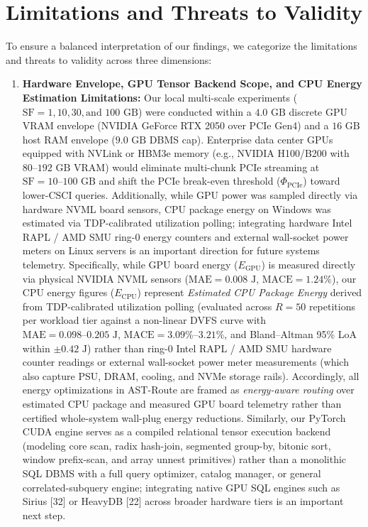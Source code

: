 \documentclass[10pt,a4paper]{article}
\begin{document}
\section{Limitations and Threats to Validity}
To ensure a balanced interpretation of our findings, we categorize the limitations and threats to validity across three dimensions:
\begin{enumerate}[leftmargin=1.5em,itemsep=2pt]
    \item \textbf{Hardware Envelope, GPU Tensor Backend Scope, and CPU Energy Estimation Limitations:} Our local multi-scale experiments ($\text{SF}=1, 10, 30, \text{and } 100\text{ GB}$) were conducted within a $4.0\text{ GB}$ discrete GPU VRAM envelope (NVIDIA GeForce RTX 2050 over PCIe Gen4) and a $16\text{ GB}$ host RAM envelope ($9.0\text{ GB}$ DBMS cap). Enterprise data center GPUs equipped with NVLink or HBM3e memory (e.g., NVIDIA H100/B200 with $80\text{--}192\text{ GB}$ VRAM) would eliminate multi-chunk PCIe streaming at $\text{SF}=10\text{--}100\text{ GB}$ and shift the PCIe break-even threshold ($\Phi_{\text{PCIe}}$) toward lower-CSCI queries. Additionally, while GPU power was sampled directly via hardware NVML board sensors, CPU package energy on Windows was estimated via TDP-calibrated utilization polling; integrating hardware Intel RAPL / AMD SMU ring-0 energy counters and external wall-socket power meters on Linux servers is an important direction for future systems telemetry. Specifically, while GPU board energy ($E_{\text{GPU}}$) is measured directly via physical NVIDIA NVML sensors ($\text{MAE}=0.008\text{ J}$, $\text{MACE}=1.24\%$), our CPU energy figures ($E_{\text{CPU}}$) represent \emph{Estimated CPU Package Energy} derived from TDP-calibrated utilization polling (evaluated across $R=50$ repetitions per workload tier against a non-linear DVFS curve with $\text{MAE}=0.098\text{--}0.205\text{ J}$, $\text{MACE}=3.09\%\text{--}3.21\%$, and Bland--Altman 95\% LoA within $\pm 0.42\text{ J}$) rather than ring-0 Intel RAPL / AMD SMU hardware counter readings or external wall-socket power meter measurements (which also capture PSU, DRAM, cooling, and NVMe storage rails). Accordingly, all energy optimizations in AST-Route are framed as \emph{energy-aware routing} over estimated CPU package and measured GPU board telemetry rather than certified whole-system wall-plug energy reductions. Similarly, our PyTorch CUDA engine serves as a compiled relational tensor execution backend (modeling core scan, radix hash-join, segmented group-by, bitonic sort, window prefix-scan, and array unnest primitives) rather than a monolithic SQL DBMS with a full query optimizer, catalog manager, or general correlated-subquery engine; integrating native GPU SQL engines such as Sirius [32] or HeavyDB [22] across broader hardware tiers is an important next step.

\end{enumerate}
\end{document}
